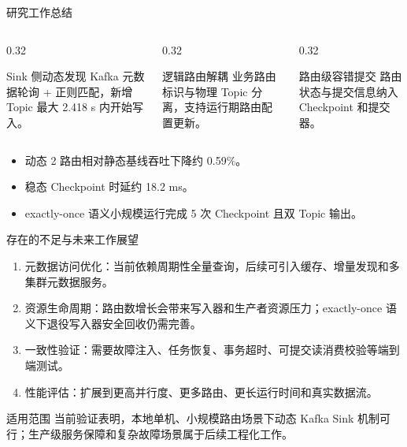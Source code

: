 \documentclass[fontset=macnew,xcolor=table,dvipsnames,svgnames,aspectratio=169]{ctexbeamer}
\begin{document}
\begin{frame}{研究工作总结}
  \begin{columns}[T,onlytextwidth]
    \begin{column}{0.32\textwidth}
      \begin{block}{Sink 侧动态发现}
        Kafka 元数据轮询 + 正则匹配，新增 Topic 最大 2.418 s 内开始写入。
      \end{block}
    \end{column}
    \begin{column}{0.32\textwidth}
      \begin{block}{逻辑路由解耦}
        业务路由标识与物理 Topic 分离，支持运行期路由配置更新。
      \end{block}
    \end{column}
    \begin{column}{0.32\textwidth}
      \begin{block}{路由级容错提交}
        路由状态与提交信息纳入 Checkpoint 和提交器。
      \end{block}
    \end{column}
  \end{columns}
  \begin{itemize}
    \item 动态 2 路由相对静态基线吞吐下降约 0.59\%。
    \item 稳态 Checkpoint 时延约 18.2 ms。
    \item exactly-once 语义小规模运行完成 5 次 Checkpoint 且双 Topic 输出。
  \end{itemize}
\end{frame}

\begin{frame}{存在的不足与未来工作展望}
  \begin{enumerate}
    \item 元数据访问优化：当前依赖周期性全量查询，后续可引入缓存、增量发现和多集群元数据服务。
    \item 资源生命周期：路由数增长会带来写入器和生产者资源压力；exactly-once 语义下退役写入器安全回收仍需完善。
    \item 一致性验证：需要故障注入、任务恢复、事务超时、可提交读消费校验等端到端测试。
    \item 性能评估：扩展到更高并行度、更多路由、更长运行时间和真实数据流。
  \end{enumerate}
  \begin{alertblock}{适用范围}
    当前验证表明，本地单机、小规模路由场景下动态 Kafka Sink 机制可行；生产级服务保障和复杂故障场景属于后续工程化工作。
  \end{alertblock}
\end{frame}

\makebottom
\end{document}
